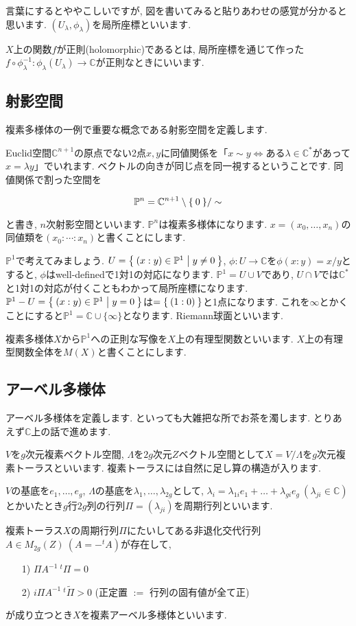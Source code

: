 \documentclass{jsarticle}
\newcommand{\CC}{\mathbb{C}}
\newcommand{\PP}{\mathbb{P}}
\theoremstyle{definition}
\numberwithin{theorem}{section}
\begin{document}
言葉にするとややこしいですが, 図を書いてみると貼りあわせの感覚が分かると思います. $(U_\lambda, \phi_\lambda)$を局所座標といいます.

$X$上の関数$f$が正則(holomorphic)であるとは, 局所座標を通じて作った$f\circ\phi_\lambda^{-1}: \phi_\lambda(U_\lambda) \rightarrow \CC$が正則なときにいいます.

\subsection{射影空間}
複素多様体の一例で重要な概念である射影空間を定義します.

Euclid空間$\CC^{n+1}$の原点でない2点$x, y$に同値関係を「$x\sim y\Leftrightarrow $ある$\lambda \in \CC^*$があって$x = \lambda y$」でいれます. ベクトルの向きが同じ点を同一視するということです. 同値関係で割った空間を

\[
\PP^n = \CC^{n+1}\setminus{\Set{0}} / \sim
\]

と書き, $n$次射影空間といいます. $\PP^n$は複素多様体になります. $x = (x_0, \ldots, x_n)$の同値類を$(x_0 : \cdots : x_n)$と書くことにします.

$\PP^1$で考えてみましょう. $U = \Set{(x:y) \in \PP^1 | y \neq 0}$, $\phi: U \rightarrow \CC$を$\phi(x:y) = x / y$とすると, $\phi$はwell-definedで1対1の対応になります. $\PP^1 = U\cup V$であり, $U\cap V$では$\CC^*$と1対1の対応が付くこともわかって局所座標になります. $\PP^1 - U = \Set{(x:y) \in \PP^1 | y = 0}$は$ = \Set{(1:0)}$と1点になります. これを$\infty$とかくことにすると$\PP^1 = \CC \cup \{\infty\}$となります. Riemann球面といいます.

複素多様体$X$から$\PP^1$への正則な写像を$X$上の有理型関数といいます. $X$上の有理型関数全体を$M(X)$と書くことにします.
\subsection{アーベル多様体}
アーベル多様体を定義します. といっても大雑把な所でお茶を濁します. とりあえず$\CC$上の話で進めます.

$V$を$g$次元複素ベクトル空間, $\Lambda$を$2g$次元$Z$ベクトル空間として$X = V/\Lambda$を$g$次元複素トーラスといいます. 複素トーラスには自然に足し算の構造が入ります.

$V$の基底を$e_1, \ldots, e_g$, $\Lambda$の基底を$\lambda_1, \ldots, \lambda_{2g}$として, $\lambda_i = \lambda_{1i}e_1 + \ldots + \lambda_{gi}e_g\ (\lambda_{ji} \in \CC)$とかいたとき$g$行$2g$列の行列$\Pi = (\lambda_{ji})$を周期行列といいます.

複素トーラス$X$の周期行列$\Pi$にたいしてある非退化交代行列$A \in M_{2g}(Z)\ (A = -^tA)$が存在して,
\begin{itemize}
\item[1)] $\Pi A^{-1}{\ }^t\Pi = 0$
\item[2)] $i \Pi A^{-1}{\ }^t\tilde\Pi > 0$ (正定置 $:=$ 行列の固有値が全て正)
\end{itemize}
が成り立つとき$X$を複素アーベル多様体といいます.
\end{document}

